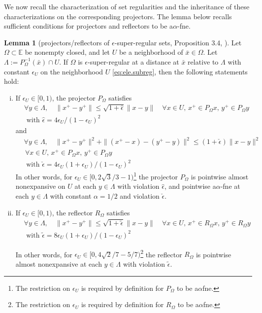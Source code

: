 \documentclass[12pt]{article}
\theoremstyle{definition}
\newtheorem{lemma}{Lemma}
\newcommand{\Ebb}{\mathbb{E}}
\begin{document}
We now recall the characterization of set regularities and the inheritance of these characterizations on the
corresponding projectors.  The lemma below recalls sufficient conditions for projectors and reflectors to be a$\alpha$-fne.
\begin{lemma}[projectors/reflectors of $\epsilon$-super-regular sets, Proposition 3.4, \cite{luke2020convergence}]
\label{lem:nonexp.refector.projector}
Let $\Omega\subset\Ebb$ be nonempty closed, and let $U$ be a neighborhood of $\bar x\in \Omega$.
Let $\Lambda:= P_{\Omega}^{-1}(\bar x)\cap U$.
If $\Omega$ is $\epsilon$-super-regular at a distance at $\bar x$
relative to $\Lambda$ with constant $\epsilon_U$ on the neighborhood $U$ \eqref{eq:ele.subreg}, then the following statements hold:
\begin{enumerate}[(i)]
    \item If $\epsilon_U\in [0,1)$, the projector $P_\Omega$ satisfies
    \begin{align*}
    &\forall y\in\Lambda, \quad \|x^+-y^+\|\leq\sqrt{1+\hat{\epsilon}} \|x-y\|
\quad\forall x\in U,\, x^+\in P_\Omega x,\, y^+\in P_\Omega y\\
    &\mbox{ with } \hat{\epsilon}= 4\epsilon_U/(1-\epsilon_U)^2
\end{align*}
and
    \begin{align*}
    &\forall y\in\Lambda, \quad \|x^+-y^+\|^2 +  \|(x^+-x)-(y^+-y)\|^2
    \leq (1+\check{\epsilon}) \|x-y\|^2\\
&\,\forall x\in U,\, x^+\in P_\Omega x,\, y^+\in P_\Omega y\\
    &\mbox{ with } \check{\epsilon}= 4\epsilon_U(1+\epsilon_U)/(1-\epsilon_U)^2
\end{align*}
In other words, for $\epsilon_U\in [0,2\sqrt{3}/3-1)$\footnote{The restriction on $\epsilon_U$ is
required by definition for $P_\Omega$ to be a$\alpha$fne.} the projector $P_\Omega$ is
pointwise almost nonexpansive on $U$ at each $y\in \Lambda$
with violation $\hat\epsilon$,
and pointwise a$\alpha$-fne at each $y\in \Lambda$ with constant $\alpha=1/2$ and violation $\check\epsilon$.
\item If $\epsilon_U\in [0,1)$, the reflector $R_\Omega$ satisfies
\begin{align}\label{e:epstilde}
&\forall y\in\Lambda, \quad    \|x^+-y^+\|\leq\sqrt{1+\tilde{\epsilon}} \|x-y\|
\quad\forall x\in U,\, x^+\in R_\Omega x,\, y^+\in R_\Omega y\\
&\mbox{ with } \tilde{\epsilon} = 8\epsilon_U(1+\epsilon_U)/(1-\epsilon_U)^2
\end{align}

In other words, for $\epsilon_U\in [0,4\sqrt{2}/7-5/7)$\footnote{The restriction on $\epsilon_U$ is
required by definition for $R_\Omega$ to be a$\alpha$fne.} the reflector
$R_\Omega$
is pointwise almost nonexpansive at each $y\in\Lambda$
with violation $\tilde{\epsilon}$.
\end{enumerate}
\end{lemma}
\end{document}
